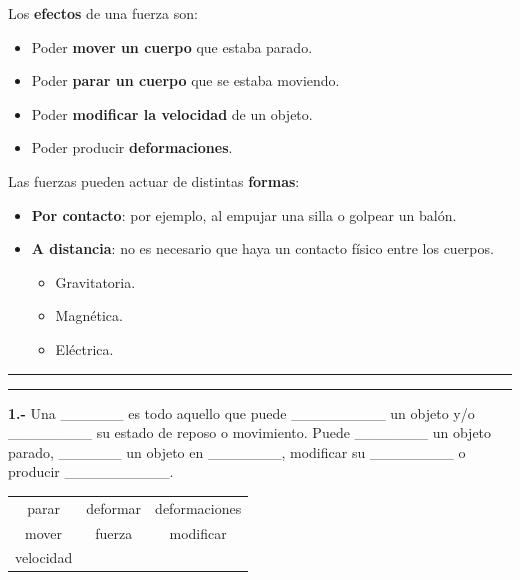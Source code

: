 \documentclass[
  letterpaper,
  DIV=11,
  numbers=noendperiod]{scrreprt}
\providecommand{\tightlist}{%
  \setlength{\itemsep}{0pt}\setlength{\parskip}{0pt}}\usepackage{longtable,booktabs,array}
\begin{document}
Los \textbf{efectos} de una fuerza son:

\begin{itemize}
\tightlist
\item
  Poder \textbf{mover un cuerpo} que estaba parado.
\item
  Poder \textbf{parar un cuerpo} que se estaba moviendo.
\item
  Poder \textbf{modificar la velocidad} de un objeto.
\item
  Poder producir \textbf{deformaciones}.
\end{itemize}

Las fuerzas pueden actuar de distintas \textbf{formas}:

\begin{itemize}
\item
  \textbf{Por contacto}: por ejemplo, al empujar una silla o golpear un
  balón.
\item
  \textbf{A distancia}: no es necesario que haya un contacto físico
  entre los cuerpos.

  \begin{itemize}
  \tightlist
  \item
    Gravitatoria.
  \item
    Magnética.
  \item
    Eléctrica.
  \end{itemize}
\end{itemize}

\begin{center}\rule{0.5\linewidth}{0.5pt}\end{center}

\begin{center}\rule{0.5\linewidth}{0.5pt}\end{center}

\textbf{1.-} Una \_\_\_\_\_\_ es todo aquello que puede
\_\_\_\_\_\_\_\_\_ un objeto y/o \_\_\_\_\_\_\_\_ su estado de reposo o
movimiento. Puede \_\_\_\_\_\_\_ un objeto parado, \_\_\_\_\_\_ un
objeto en \_\_\_\_\_\_\_, modificar su \_\_\_\_\_\_\_\_ o producir
\_\_\_\_\_\_\_\_\_\_.

\begin{longtable}[]{@{}ccc@{}}
\toprule\noalign{}
\endhead
\bottomrule\noalign{}
\endlastfoot
parar & deformar & deformaciones \\
mover & fuerza & modificar \\
velocidad & & \\
\end{longtable}
\end{document}
